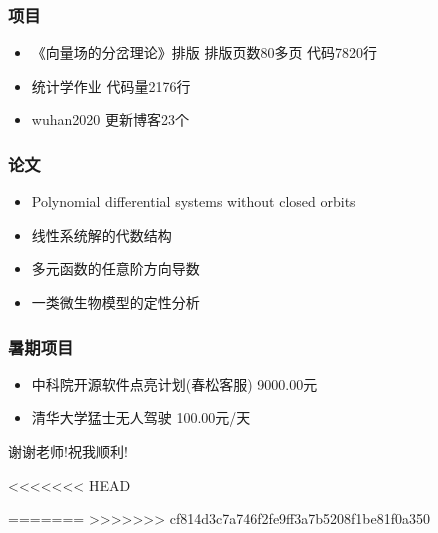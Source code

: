 \documentclass{beamer}
\begin{document}
\begin{frame}
  \frametitle{项目}
 \begin{itemize}
\item 《向量场的分岔理论》排版 排版页数80多页 代码7820行
\pause
\item 统计学作业 代码量2176行 
\pause
\item wuhan2020 更新博客23个
  
\end{itemize}

\end{frame}

\begin{frame}
  \frametitle{论文}
  
  \begin{itemize}
  \item Polynomial differential systems without closed orbits
    \pause
  \item 线性系统解的代数结构
    \pause
  \item 多元函数的任意阶方向导数
    \pause
  \item 一类微生物模型的定性分析
    \pause
  \end{itemize}
  
\end{frame}

\begin{frame}
  \frametitle{暑期项目}
  \begin{itemize}
  \item 中科院开源软件点亮计划(春松客服) 9000.00元
    \pause
  \item 清华大学猛士无人驾驶 100.00元/天
    \pause
  \end{itemize}
\end{frame}

\begin{frame}
  \begin{center}
\Huge { 谢谢老师!祝我顺利!}
  \end{center}
\end{frame}

<<<<<<< HEAD
\begin{frame}
\end{frame}

=======
>>>>>>> cf814d3c7a746f2fe9ff3a7b5208f1be81f0a350
\end{document}
